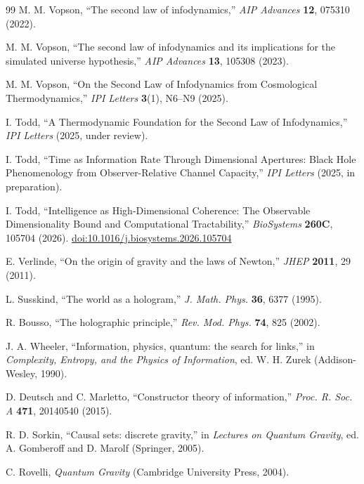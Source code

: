 \documentclass[11pt,a4paper]{article}
\begin{document}
\begin{thebibliography}{99}
M. M. Vopson, ``The second law of infodynamics,'' \textit{AIP Advances} \textbf{12}, 075310 (2022).

M. M. Vopson, ``The second law of infodynamics and its implications for the simulated universe hypothesis,'' \textit{AIP Advances} \textbf{13}, 105308 (2023).

M. M. Vopson, ``On the Second Law of Infodynamics from Cosmological Thermodynamics,'' \textit{IPI Letters} \textbf{3}(1), N6--N9 (2025).

I. Todd, ``A Thermodynamic Foundation for the Second Law of Infodynamics,'' \textit{IPI Letters} (2025, under review).

I. Todd, ``Time as Information Rate Through Dimensional Apertures: Black Hole Phenomenology from Observer-Relative Channel Capacity,'' \textit{IPI Letters} (2025, in preparation).

I. Todd, ``Intelligence as High-Dimensional Coherence: The Observable Dimensionality Bound and Computational Tractability,'' \textit{BioSystems} \textbf{260C}, 105704 (2026). \href{https://doi.org/10.1016/j.biosystems.2026.105704}{doi:10.1016/j.biosystems.2026.105704}

E. Verlinde, ``On the origin of gravity and the laws of Newton,'' \textit{JHEP} \textbf{2011}, 29 (2011).

L. Susskind, ``The world as a hologram,'' \textit{J. Math. Phys.} \textbf{36}, 6377 (1995).

R. Bousso, ``The holographic principle,'' \textit{Rev. Mod. Phys.} \textbf{74}, 825 (2002).

J. A. Wheeler, ``Information, physics, quantum: the search for links,'' in \textit{Complexity, Entropy, and the Physics of Information}, ed. W. H. Zurek (Addison-Wesley, 1990).

D. Deutsch and C. Marletto, ``Constructor theory of information,'' \textit{Proc. R. Soc. A} \textbf{471}, 20140540 (2015).

R. D. Sorkin, ``Causal sets: discrete gravity,'' in \textit{Lectures on Quantum Gravity}, ed. A. Gomberoff and D. Marolf (Springer, 2005).

C. Rovelli, \textit{Quantum Gravity} (Cambridge University Press, 2004).


\end{thebibliography}
\end{document}
